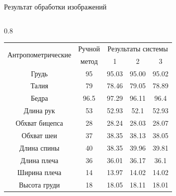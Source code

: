 \documentclass[10pt,pdf,hyperref={unicode},xcolor=table]{beamer}
\begin{document}
\begin{frame}{Результат обработки изображений}		
\begin{columns}
		\begin{column} {0.8\textwidth}
\begin{table}[b!]%
		\begin{tabular}{|c|c|c|c|c|}
    \hline
    \multirow{2}{*}{Антропометрические} & {Ручной} & \multicolumn{3}{c}{Результаты системы} \\
      признаки & метод  &1 &2 &3 \\
    \hline
Грудь             &95	&95.03	&95.00	&95.02	\\
\hline 
Талия             &79	&78.46	&79.05	&78.89 \\

\hline
Бедра               &96.5	&97.29	&96.11	&96.4\\

\hline
Длина рук           &53	&52.93		&52.1	&52.93\\

\hline
Обхват бицепса      &28	&28.24	&28.03	&28.07\\

\hline
Обхват шеи         &37	&38.35	&38.13	&38.05	\\

\hline
Длина спины         &40	&38.35	&39.96	&39.81	\\

\hline
Длина плеча       &36	&36.01	&36.17	&36.1	\\

\hline
Ширина плеча        &14	&13.97	&14.02	&14.02	\\

\hline
Высота груди       &18	&18.05	&18.11	&18.01 \\


\end{tabular}
\end{table}
\end{column}
\end{columns}
\end{frame}
\end{document}
